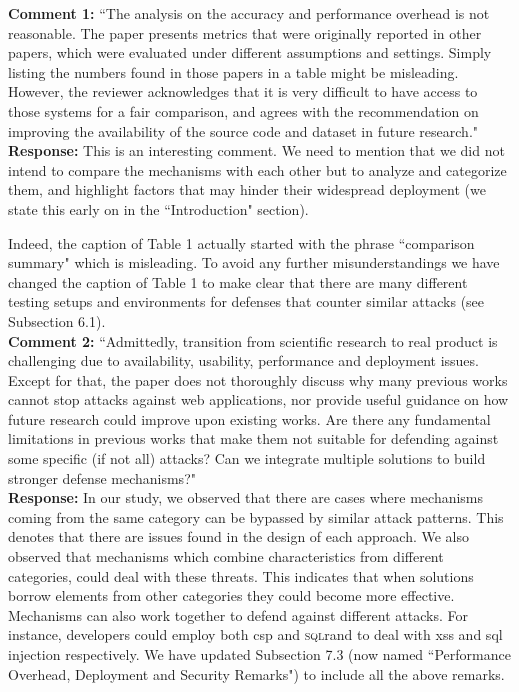 \documentclass[10pt,journal,compsoc]{IEEEtran}
\begin{document}
{\bf Comment 1:} ``The analysis on the accuracy
and performance overhead is not reasonable.
The paper presents metrics that were originally
reported in other papers,
which were evaluated under different
assumptions and settings.
Simply listing the numbers found in those papers
in a table might be misleading.
However,
the reviewer acknowledges that it is very
difficult to have access to those systems for a fair comparison,
and agrees with the recommendation on improving
the availability of the source code and dataset
in future research."\\

\noindent
{\bf Response:}
This is an interesting comment.
We need to mention that we did not intend to
compare the mechanisms with each other
but to analyze and categorize them,
and highlight factors that may hinder
their widespread deployment
(we state this early on in the
``Introduction" section).

Indeed,
the caption of Table 1 actually
started with the phrase ``comparison summary"
which is misleading.
To avoid any further misunderstandings
we have changed the caption of Table 1
to make clear that there
are many different testing setups and
environments for defenses that counter
similar attacks (see Subsection 6.1).\\

\noindent
{\bf Comment 2:} ``Admittedly, transition
from scientific research to real product
is challenging due to availability, usability,
performance and deployment issues.
Except for that, the paper does not thoroughly
discuss why many previous works
cannot stop attacks against web applications,
nor provide useful guidance on
how future research could improve upon existing works.
Are there any fundamental
limitations in previous works that make
them not suitable for defending against
some specific (if not all) attacks?
Can we integrate multiple solutions to build
stronger defense mechanisms?"\\

\noindent
{\bf Response:}
In our study,
we observed that there are cases where
mechanisms coming from the same category
can be bypassed by similar attack patterns.
This denotes that there are issues
found in the design of each approach.
We also observed that mechanisms which
combine characteristics
from different categories,
could deal with these threats.
This indicates that when solutions
borrow elements from other categories
they could become more effective.
Mechanisms can also work together
to defend against different attacks.
For instance,
developers could employ both {\sc csp}
and \textsc{sql}rand
to deal with {\sc xss} and
{\sc sql} injection respectively.
We have updated Subsection 7.3
(now named ``Performance Overhead,
Deployment and Security Remarks")
to include all the above remarks.\\
\end{document}
